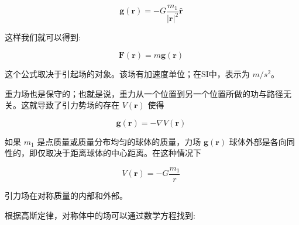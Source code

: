 \begin{equation}
\mathbf{g}(\mathbf{r}) = -G \frac{m_1}{|\mathbf{r}|^2} \hat{\mathbf{r}}~
\end{equation}

这样我们就可以得到:

\begin{equation}
\mathbf{F}(\mathbf{r}) = m \mathbf{g}(\mathbf{r})~
\end{equation}

这个公式取决于引起场的对象。该场有加速度单位；在SI中，表示为 $m/s^2$。

重力场也是保守的；也就是说，重力从一个位置到另一个位置所做的功与路径无关。这就导致了引力势场的存在 $V(\mathbf{r})$ 使得

\begin{equation}
\mathbf{g}(\mathbf{r}) = -\nabla V(\mathbf{r})~
\end{equation}

如果 $m_1$ 是点质量或质量分布均匀的球体的质量，力场 $\mathbf{g}(\mathbf{r})$ 球体外部是各向同性的，即仅取决于距离球体的中心距离。在这种情况下

\begin{equation}
V(\mathbf{r}) = -G \frac{m_1}{r}~
\end{equation}

引力场在对称质量的内部和外部。

根据高斯定律，对称体中的场可以通过数学方程找到:
